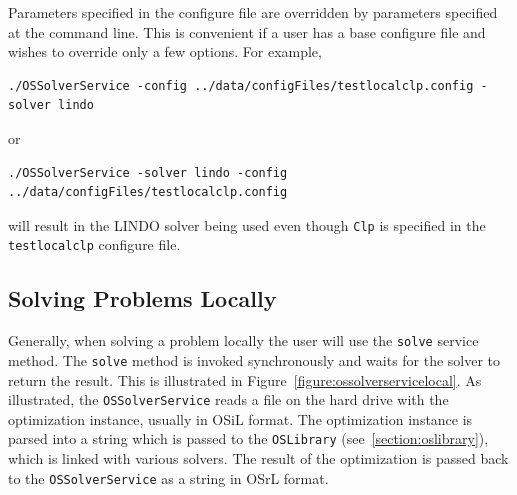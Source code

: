 \documentclass[11pt]{article}
\newcounter{Fig}
\renewcommand{\_}{{\char"5F}}
\renewcommand{\{}{{\char"7B}}
\renewcommand{\}}{{\char"7D}}
\renewcommand{\^}{{\char"0D}}
\renewcommand{\'}{{\char"0D}}
\begin{document}
\begin{enumerate}[Step 1:]
\begin{enumerate}
\end{enumerate}



Parameters specified in the configure file are overridden by parameters specified at the command line.
This is convenient if a user has a base configure file and wishes to override only a few options. For example,
\begin{verbatim}
./OSSolverService -config ../data/configFiles/testlocalclp.config -solver lindo
\end{verbatim}
or
\begin{verbatim}
./OSSolverService -solver lindo -config ../data/configFiles/testlocalclp.config
\end{verbatim}
will result in the LINDO solver being used even though {\tt Clp} is specified in the
{\tt testlocalclp} configure file.



\subsection{Solving Problems Locally}

Generally, when solving a problem locally the user will use the {\tt solve} service method.
The {\tt solve} method is invoked synchronously and waits for the solver to return the result.  This is illustrated
in Figure~\ref{figure:ossolverservicelocal}. As illustrated, the {\tt OSSolverService} reads a file on the hard drive
with the optimization instance, usually in OSiL format. The optimization instance is parsed into a string
which is passed to the {\tt OSLibrary} (see~\ref{section:oslibrary}),
which is linked with various solvers.
The result of the optimization is passed back to the {\tt OSSolverService} as a string in OSrL format.




\end{enumerate}
\end{document}
